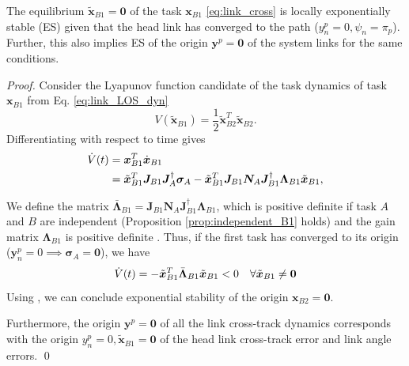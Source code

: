 \documentclass[../main.tex]{subfiles}
\begin{document}
\begin{lemma}
    \label{lem:task_B1}
    The equilibrium $\tilde{\bm{x}}_{B1} = \bm{0}$ of the task $\bm{x}_{B1}$ \eqref{eq:link_cross} is locally exponentially stable (ES) given that the head link has converged to the path ($y^p_n = 0, \psi_n = \pi_p$). Further, this also implies ES of the origin $\bm{y}^p = \bm{0}$ of the system links for the same conditions.
\end{lemma}
\begin{proof}
    Consider the Lyapunov function candidate of the task dynamics of task $\bm{x}_{B1}$ from Eq. \eqref{eq:link_LOS_dyn}
    \begin{equation}
        \label{eq:V_B1}
        V(\tilde{\bm{x}}_{B1}) = \frac{1}{2} \tilde{\bm{x}}_{B2}^T\tilde{\bm{x}}_{B2}.
    \end{equation}
    Differentiating with respect to time gives
    \begin{align}
        \label{eq:V_dot_B1}
        \dot{V}(t) &= \bm{x}_{B1}^T \dot{\bm{x}}_{B1} \\ \notag
        &= \tilde{\bm{x}}_{B1}^T \bm{J}_{B1}\bm{J}_A^{\dagger}\bm{\sigma}_A
        - \tilde{\bm{x}}_{B1}^T\bm{J}_{B1} \bm{N}_A \bm{J}_{B1}^\dagger \bm{\Lambda}_{B1} \tilde{\bm{x}}_{B1},
    \end{align}

    We define the matrix $\bar{\bm{\Lambda}}_{B1} = \bm{J}_{B1}\bm{N}_A \bm{J}_{B1}^\dagger \bm{\Lambda}_{B1}$, which is positive definite if task $A$ and $B$ are independent (Proposition \ref{prop:independent_B1} holds) and the gain matrix $\bm{\Lambda}_{B1}$ is positive definite \citep{antonelli2009}. Thus, if the first task has converged to its origin ($\bm{y}_n^p = 0 \implies \bm{\sigma}_A = \bm{0}$), we have
    \begin{equation}
        \dot{V}(t) = -\tilde{\bm{x}}_{B1}^T \bar{\bm{\Lambda}}_{B1} \tilde{\bm{x}}_{B1} < 0 \quad \forall \tilde{\bm{x}}_{B1} \neq \bm{0}\\
    \end{equation}
    Using \cite[Theorem 4.10]{khalil2002}, we can conclude exponential stability of the origin $\bm{x}_{B2} = \bm{0}$.

    Furthermore, the origin $\bm{y}^p = \bm{0}$ of all the link cross-track dynamics corresponds with the origin $y^p_n = 0, \tilde{\bm{x}}_{B1} = \bm{0}$ of the head link cross-track error and link angle errors.
    \qed
\end{proof}
\end{document}
